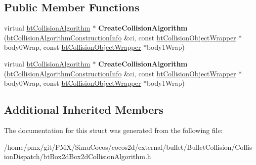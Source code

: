 \subsection*{Public Member Functions}
\begin{DoxyCompactItemize}
\item 
\mbox{\label{structbtBox2dBox2dCollisionAlgorithm_1_1CreateFunc_a7321f4735c28b7fe137b140d67c230a2}} 
virtual \hyperlink{classbtCollisionAlgorithm}{bt\+Collision\+Algorithm} $\ast$ {\bfseries Create\+Collision\+Algorithm} (\hyperlink{structbtCollisionAlgorithmConstructionInfo}{bt\+Collision\+Algorithm\+Construction\+Info} \&ci, const \hyperlink{structbtCollisionObjectWrapper}{bt\+Collision\+Object\+Wrapper} $\ast$body0\+Wrap, const \hyperlink{structbtCollisionObjectWrapper}{bt\+Collision\+Object\+Wrapper} $\ast$body1\+Wrap)
\item 
\mbox{\label{structbtBox2dBox2dCollisionAlgorithm_1_1CreateFunc_a7321f4735c28b7fe137b140d67c230a2}} 
virtual \hyperlink{classbtCollisionAlgorithm}{bt\+Collision\+Algorithm} $\ast$ {\bfseries Create\+Collision\+Algorithm} (\hyperlink{structbtCollisionAlgorithmConstructionInfo}{bt\+Collision\+Algorithm\+Construction\+Info} \&ci, const \hyperlink{structbtCollisionObjectWrapper}{bt\+Collision\+Object\+Wrapper} $\ast$body0\+Wrap, const \hyperlink{structbtCollisionObjectWrapper}{bt\+Collision\+Object\+Wrapper} $\ast$body1\+Wrap)
\end{DoxyCompactItemize}
\subsection*{Additional Inherited Members}


The documentation for this struct was generated from the following file\+:\begin{DoxyCompactItemize}
\item 
/home/pmx/git/\+P\+M\+X/\+Simu\+Cocos/cocos2d/external/bullet/\+Bullet\+Collision/\+Collision\+Dispatch/bt\+Box2d\+Box2d\+Collision\+Algorithm.\+h\end{DoxyCompactItemize}
